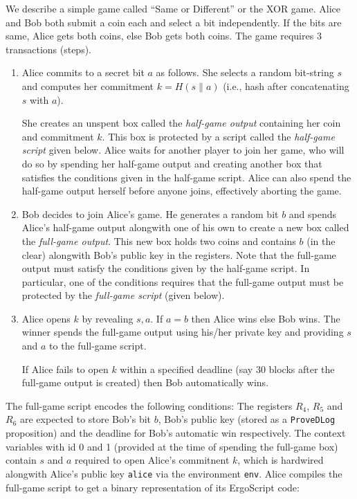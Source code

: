 \documentclass[11pt]{article}
\newcommand{\langname}{ErgoScript\xspace}
\begin{document}
We describe a simple game called ``Same or Different'' or the XOR game. Alice and Bob both submit a coin each and select a bit independently. If the bits are same, Alice gets both coins, else Bob gets both coins. The game requires 3 transactions (steps). 
\begin{enumerate}
	\item Alice commits to a secret bit $a$ as follows. She selects a random bit-string $s$ and computes her commitment $k = H(s\|a)$ (i.e., hash after concatenating $s$ with $a$).
	
	She creates an unspent box called the {\em half-game output} containing her coin and commitment $k$. This box is protected by a script called the {\em half-game script}  given below. Alice waits for another player to join her game, who will do so by spending her half-game output and creating another box that satisfies the conditions given in the half-game script. Alice can also spend the half-game output herself before anyone joins, effectively aborting the game. 
	
	\item Bob decides to join Alice's game. He generates a random bit $b$ and spends Alice's half-game output alongwith one of his own to create a new box called the {\em full-game output}. This new box  holds two coins and contains $b$ (in the clear) alongwith Bob's public key in the registers. 
	Note that the full-game output must satisfy the conditions given by the half-game script. In particular, one of the conditions requires that the full-game output must be protected by the {\em full-game script} (given below).
	\item Alice opens $k$ by revealing $s, a$. If $a = b$ then Alice wins else Bob wins. The winner spends the full-game output using his/her private key and providing $s$ and $a$ to the full-game script.

	If Alice fails to open $k$ within a specified deadline (say 30 blocks after the full-game output is created) then Bob automatically wins. 
\end{enumerate}

The full-game script encodes the following conditions: The registers $R_4$, $R_5$ and $R_6$ are expected to store Bob's bit $b$, Bob's public key (stored as a \texttt{ProveDLog} proposition) and the deadline for Bob's automatic win respectively. The context variables with id 0 and 1 (provided at the time of spending the full-game box) contain $s$ and $a$ required to open Alice's commitnent $k$, which is hardwired alongwith Alice's public key \texttt{alice} via the environment \texttt{env}. 
Alice compiles the full-game script to get a binary representation of its \langname code: 
\end{document}
